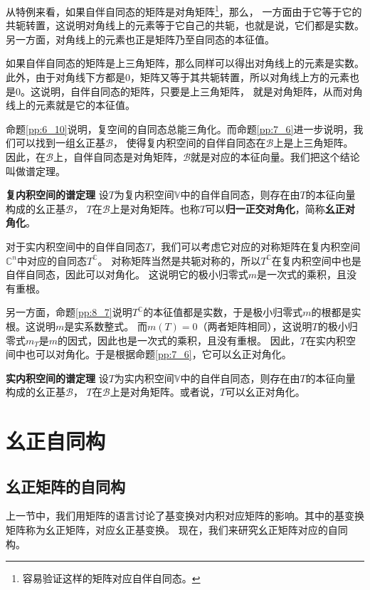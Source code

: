 \documentclass[12pt,UTF8]{ctexbook}
\begin{document}
从特例来看，如果自伴自同态的矩阵是对角矩阵\footnote{容易验证这样的矩阵对应自伴自同态。}，那么，
一方面由于它等于它的共轭转置，这说明对角线上的元素等于它自己的共轭，也就是说，它们都是实数。
另一方面，对角线上的元素也正是矩阵乃至自同态的本征值。

如果自伴自同态的矩阵是上三角矩阵，那么同样可以得出对角线上的元素是实数。此外，由于对角线下方都是0，矩阵又等于其共轭转置，所以对角线上方的元素也是0。这说明，自伴自同态的矩阵，只要是上三角矩阵，
就是对角矩阵，从而对角线上的元素就是它的本征值。

命题\ref{pp:6_10}说明，复空间的自同态总能三角化。而命题\ref{pp:7_6}进一步说明，我们可以找到一组幺正基$\mathcal{B}$，
使得复内积空间的自伴自同态在$\mathcal{B}$上是上三角矩阵。
因此，在$\mathcal{B}$上，自伴自同态是对角矩阵，$\mathcal{B}$就是对应的本征向量。我们把这个结论叫做谱定理。
\begin{pp}\textbf{复内积空间的谱定理 }\label{pp:8_8}
    设$T$为复内积空间$\mathbb{V}$中的自伴自同态，则存在由$T$的本征向量构成的幺正基$\mathcal{B}$，
    $T$在$\mathcal{B}$上是对角矩阵。也称$T$可以\textbf{归一正交对角化}，简称\textbf{幺正对角化}。
\end{pp}

对于实内积空间中的自伴自同态$T$，我们可以考虑它对应的对称矩阵在复内积空间$\mathbb{C}^n$中对应的自同态$T^{\mathbb{C}}$。
对称矩阵当然是共轭对称的，所以$T^{\mathbb{C}}$在复内积空间中也是自伴自同态，因此可以对角化。
这说明它的极小归零式$m$是一次式的乘积，且没有重根。

另一方面，命题\ref{pp:8_7}说明$T^{\mathbb{C}}$的本征值都是实数，于是极小归零式$m$的根都是实根。这说明$m$是实系数整式。
而$m(T) = 0$（两者矩阵相同），这说明$T$的极小归零式$m_T$是$m$的因式，因此也是一次式的乘积，且没有重根。
因此，$T$在实内积空间中也可以对角化。于是根据命题\ref{pp:7_6}，它可以幺正对角化。
\begin{pp}\textbf{实内积空间的谱定理 }\label{pp:8_8_0}
    设$T$为实内积空间$\mathbb{V}$中的自伴自同态，则存在由$T$的本征向量构成的幺正基$\mathcal{B}$，
    $T$在$\mathcal{B}$上是对角矩阵。或者说，$T$可以幺正对角化。
\end{pp}

\section{幺正自同构}
\subsection{幺正矩阵的自同构}
上一节中，我们用矩阵的语言讨论了基变换对内积对应矩阵的影响。其中的基变换矩阵称为幺正矩阵，对应幺正基变换。
现在，我们来研究幺正矩阵对应的自同构。
\end{document}
